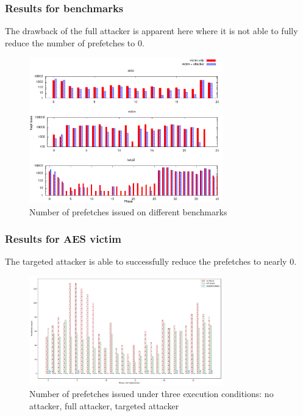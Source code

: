 \documentclass[10pt]{beamer}
\begin{document}
\begin{frame}
\frametitle{Results for benchmarks}
The drawback of the full attacker is apparent here where it is not able to fully reduce
the number of prefetches to 0.

\begin{figure}[ht]
    \centering
    \includegraphics[width=0.75\textwidth]{figures/hwpf_num}
    \caption{Number of prefetches issued on different benchmarks}
\end{figure}
\end{frame}

\begin{frame}
\frametitle{Results for AES victim}
The targeted attacker is able to successfully reduce the prefetches to nearly 0.
\begin{figure}[ht]
    \centering
    \includegraphics[width=0.75\textwidth]{figures/pf_issued.png}
    \caption{Number of prefetches issued under three execution conditions: no attacker, full attacker, targeted attacker}
\end{figure}
\end{frame}
\end{document}
